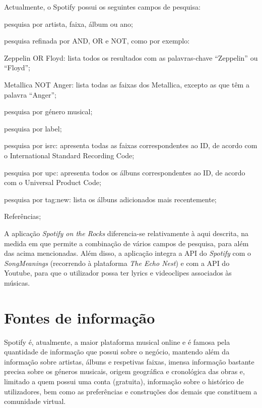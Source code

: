 \documentclass[twocolumn,twoside,11pt,a4paper]{article}
\begin{document}
Actualmente, o Spotify possui os seguintes campos de pesquisa:
\begin{compactitem}
  \item pesquisa por artista, faixa, álbum ou ano;
  \item pesquisa refinada por AND, OR e NOT, como por exemplo:
    \begin{compactitem}
      \item Zeppelin OR Floyd: lista todos os resultados com as palavras-chave
        “Zeppelin” ou “Floyd”;
      \item Metallica NOT Anger: lista todas as faixas dos Metallica, excepto as que têm
        a palavra “Anger”;
    \end{compactitem}
  \item pesquisa por género musical;
  \item pesquisa por label;
  \item pesquisa por isrc: apresenta todas as faixas correspondentes ao ID, de acordo com
    o International Standard Recording Code;
  \item pesquisa por upc: apresenta todos os álbuns correspondentes ao ID, de acordo com
    o Universal Product Code;
  \item pesquisa por tag:new: lista os álbuns adicionados mais recentemente;
  \item Referências;
\end{compactitem}


A aplicação \textit{Spotify on the Rocks} diferencia-se relativamente à aqui descrita,
na medida em que permite a combinação de vários campos de pesquisa, para além das
acima mencionadas.
Além disso, a aplicação integra a API do \textit{Spotify} com o \textit{SongMeanings}
(recorrendo à plataforma \textit{The Echo Nest}) e com a API do Youtube, para que o
utilizador possa ter lyrics e videoclipes associados às músicas.



\section{Fontes de informação}\label{sec:sources}

Spotify é, atualmente, a maior plataforma musical online e é famosa pela quantidade de
informação que possui sobre o negócio, mantendo além da informação sobre artistas, álbuns
e respetivas faixas, imensa informação bastante precisa sobre os géneros musicais, origem
geográfica e cronológica das obras e, limitado a quem possui uma conta (gratuita), informação
sobre o histórico de utilizadores, bem como as preferências e construções dos demais que
constituem a comunidade virtual.
\end{document}
